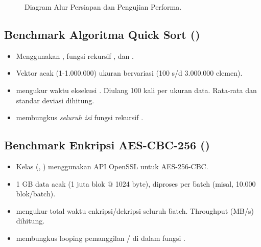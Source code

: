 \begin{figure}[htbp]
\caption{Diagram Alur Persiapan dan Pengujian Performa.}
\label{fig:flow_perf_rev} %
\end{figure}


\subsection{Benchmark Algoritma Quick Sort ()}
\begin{itemize}
    \item {} Menggunakan , fungsi rekursif , dan .
    \item {} Vektor acak (1-1.000.000) ukuran bervariasi (100 s/d 3.000.000 elemen).
    \item {}  mengukur waktu eksekusi . Diulang 100 kali per ukuran data. Rata-rata dan standar deviasi dihitung.
    \item {}  membungkus \textit{seluruh isi} fungsi rekursif .
\end{itemize}

\subsection{Benchmark Enkripsi AES-CBC-256 ()}
\begin{itemize}
    \item {} Kelas  (, ) menggunakan API  OpenSSL untuk AES-256-CBC.
    \item {} 1 GB data acak (1 juta blok @ 1024 byte), diproses per \f{batch} (misal, 10.000 blok/batch).
    \item {}  mengukur total waktu enkripsi/dekripsi seluruh \f{batch}. \f{Throughput} (MB/s) dihitung.
    \item {}  membungkus \f{looping} pemanggilan / di dalam fungsi .
\end{itemize}

